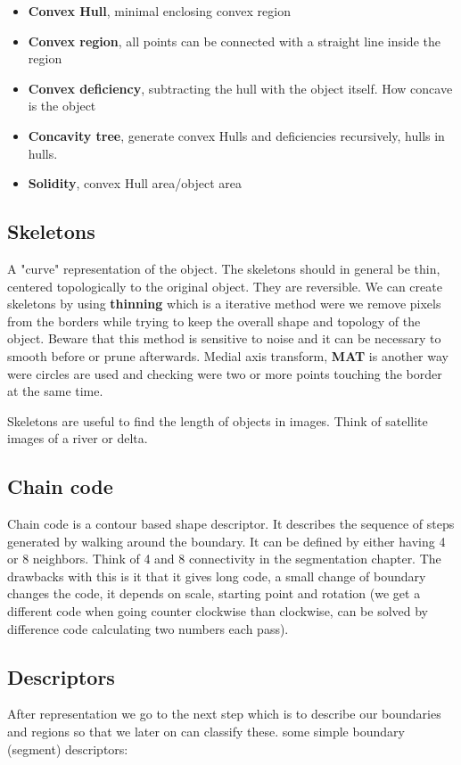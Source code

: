 \begin{itemize}
	\item \textbf{Convex Hull}, minimal enclosing convex region
	\item \textbf{Convex region}, all points can be connected with a straight line inside the region
	\item \textbf{Convex deficiency}, subtracting the hull with the object itself. How concave is the object
	\item \textbf{Concavity tree}, generate convex Hulls and deficiencies recursively, hulls in hulls.
	\item \textbf{Solidity}, convex Hull area/object area
\end{itemize}

\subsection*{Skeletons}
A "curve" representation of the object. The skeletons should in general be thin, centered topologically to the original object. They are reversible. We can create skeletons by using \textbf{thinning} which is a iterative method were we remove pixels from the borders while trying to keep the overall shape and topology of the object. Beware that this method is sensitive to noise and it can be necessary to smooth before or prune afterwards. Medial axis transform, \textbf{MAT} is another way were circles are used and checking were two or more points touching the border at the same time.  

\begin{wbox}{}
Skeletons are useful to find the length of objects in images. Think of satellite images of a river or delta. 
\end{wbox}

\subsection*{Chain code}
Chain code is a contour based shape descriptor. It describes the sequence of steps generated by walking around the boundary. It can be defined by either having 4 or 8 neighbors. Think of 4 and 8 connectivity in the segmentation chapter. The drawbacks with this is it that it gives long code, a small change of boundary changes the code, it depends on scale, starting point and rotation (we get a different code when going counter clockwise than clockwise, can be solved by difference code calculating two numbers each pass). 


\subsection*{Descriptors}
After representation we go to the next step which is to describe our boundaries and regions so that we later on can classify these. some simple boundary (segment) descriptors:

